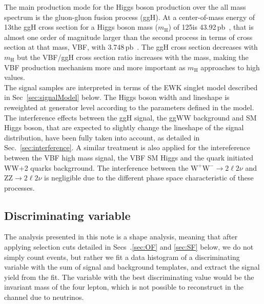 The main production mode for the Higgs boson production over the all mass spectrum is the gluon-gluon fusion process (ggH). At a center-of-mass energy of 13\TeV the ggH cross section for a Higgs boson mass ($m_\mathrm{H}$) of 125\GeV is 43.92\,pb~\cite{temphiggsxsecs}, that is almost one order of magnitude larger than the second process  in terms of cross section at that mass, VBF, with 3.748\,pb~\cite{temphiggsxsecs}. The ggH cross section decreases with $m_\mathrm{H}$ but the VBF/ggH cross section ratio increases with the mass, making the VBF production mechanism more and more important as $m_\mathrm{H}$ approaches to high values.\\
The signal samples are interpreted in terms of the EWK singlet model described
in Sec~\ref{sec:signalModel} below. The Higgs boson width and lineshape is reweighted at generator level according to the parameters defined in the model.
The interference effects between the ggH signal, the ggWW background and SM
Higgs boson, that are expected to slightly change the lineshape of the signal
distribution, have been fully taken into account, as detailed in
Sec.~\ref{sec:interference}. A similar treatment is also applied for the
intereference between the VBF high mass signal, the VBF SM Higgs and the quark
initiated WW+2 quarks backgrround. The interference between the $\mathrm{W^+W^-}\to2\ell2\nu$ and $\mathrm{ZZ}\to2\ell2\nu$ is negligible due to the different phase space characteristic of these processes. 

\subsection{Discriminating variable}
The analysis presented in this note is a shape analysis, meaning that after
applying selection cuts detailed in Secs~.\ref{sec:OF} and \ref{sec:SF} below,
we do not simply count events, but rather we fit a data histogram of a
discriminating variable with the sum of signal and background templates, and
extract the signal yield from the fit.
The variable with the best discriminating value would be the invariant mass of
the four lepton, which is not possible to reconstruct in the \WW channel due
to neutrinos.

